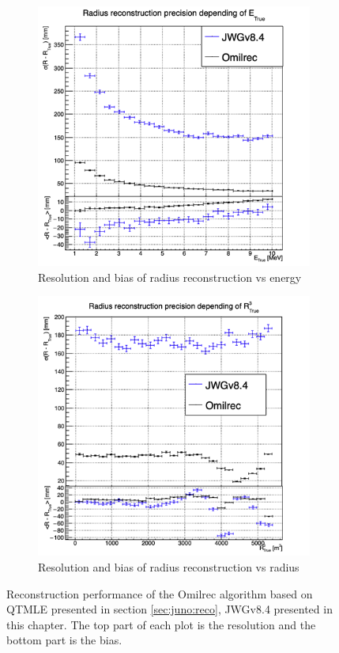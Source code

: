 \documentclass[../main.tex]{subfiles}
\begin{document}
\begin{figure}[ht]
  \begin{subfigure}[t]{0.48\linewidth}
    \centering
    \includegraphics[width=\linewidth]{images/jgnn/MSBvTE_nox.png}
    \caption{Resolution and bias of radius reconstruction vs energy}
    \label{fig:jgnn:MSBvETC_nox}
  \end{subfigure}
  \begin{subfigure}[t]{0.48\linewidth}
    \centering
    \includegraphics[width=\linewidth]{images/jgnn/MSBvRT_nox.png}
    \caption{Resolution and bias of radius reconstruction vs radius}
    \label{fig:jgnn:MSBvRTC_nox}
  \end{subfigure}
  \caption{Reconstruction performance of the Omilrec algorithm based on QTMLE presented in section \ref{sec:juno:reco}, JWGv8.4 presented in this chapter. The top part of each plot is the resolution and the bottom part is the bias.}
  \label{fig:jgnn:results_nox_2}
\end{figure}
\end{document}
